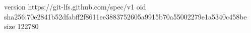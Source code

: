 version https://git-lfs.github.com/spec/v1
oid sha256:70e2841b52dfabff2f8611ee3883752605a9915b70a55002279e1a5340c458be
size 122780
